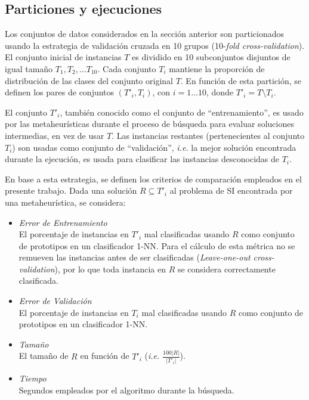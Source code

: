 \subsection{Particiones y ejecuciones}

Los conjuntos de datos considerados en la sección anterior son particionados usando la estrategia de validación cruzada en 10 grupos (10-\emph{fold cross-validation}). El conjunto inicial de instancias $T$ es dividido en 10 subconjuntos disjuntos de igual tamaño $T_1, T_2, \dots T_{10}$. Cada conjunto $T_i$ mantiene la proporción de distribución de las clases del conjunto original $T$. En función de esta partición, se definen los pares de conjuntos $(T'_i, T_i)$, con $i = 1 \dots 10$, donde $T'_i = T \setminus T_i$.

El conjunto $T'_i$, también conocido como el conjunto de ``entrenamiento'', es usado por las metaheurísticas durante el proceso de búsqueda para evaluar soluciones intermedias, en vez de usar $T$. %
Las instancias restantes (pertenecientes al conjunto $T_i$) son usadas como conjunto de ``validación'', \emph{i.e.} la mejor solución encontrada durante la ejecución, es usada para clasificar las instancias desconocidas de $T_i$.

En base a esta estrategia, se definen los criterios de comparación empleados en el presente trabajo. Dada una solución $R \subseteq T'_i$ al problema de SI encontrada por una metaheurística, se considera:

\begin{itemize}
\item \emph{Error de Entrenamiento}\\
El porcentaje de instancias en $T'_i$ mal clasificadas usando $R$ como conjunto de prototipos en un clasificador 1-NN. Para el cálculo de esta métrica no se remueven las instancias antes de ser clasificadas (\emph{Leave-one-out cross-validation}), por lo que toda instancia en $R$ se considera correctamente clasificada.
\item \emph{Error de Validación}\\
El porcentaje de instancias en $T_i$ mal clasificadas usando $R$ como conjunto de prototipos en un clasificador 1-NN.
\item \emph{Tamaño}\\
El tamaño de $R$ en función de $T'_i$ (\emph{i.e.} $\frac{100 \vert R \vert}{\vert T'_i \vert}$).
\item \emph{Tiempo}\\
Segundos empleados por el algoritmo durante la búsqueda.
\end{itemize} 


